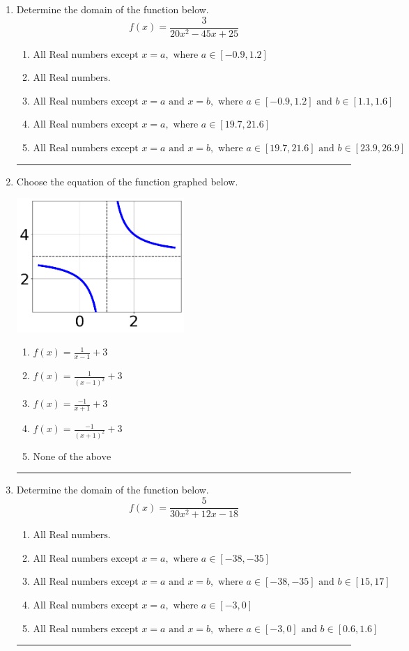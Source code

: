 \documentclass[14pt]{extbook}
\newcommand{\litem}[1]{\item#1\hspace*{-1cm}\rule{\textwidth}{0.4pt}}
\begin{document}
\begin{enumerate}
{\begin{enumerate}[label=\Alph*.]
\end{enumerate} }
\litem{
Determine the domain of the function below.\[ f(x) = \frac{3}{20x^{2} -45 x + 25} \]\begin{enumerate}[label=\Alph*.]
\item \( \text{All Real numbers except } x = a, \text{ where } a \in [-0.9, 1.2] \)
\item \( \text{All Real numbers.} \)
\item \( \text{All Real numbers except } x = a \text{ and } x = b, \text{ where } a \in [-0.9, 1.2] \text{ and } b \in [1.1, 1.6] \)
\item \( \text{All Real numbers except } x = a, \text{ where } a \in [19.7, 21.6] \)
\item \( \text{All Real numbers except } x = a \text{ and } x = b, \text{ where } a \in [19.7, 21.6] \text{ and } b \in [23.9, 26.9] \)

\end{enumerate} }
\litem{
Choose the equation of the function graphed below.
\begin{center}
    \includegraphics[width=0.5\textwidth]{../Figures/rationalGraphToEquationA.png}
\end{center}
\begin{enumerate}[label=\Alph*.]
\item \( f(x) = \frac{1}{x - 1} + 3 \)
\item \( f(x) = \frac{1}{(x - 1)^2} + 3 \)
\item \( f(x) = \frac{-1}{x + 1} + 3 \)
\item \( f(x) = \frac{-1}{(x + 1)^2} + 3 \)
\item \( \text{None of the above} \)

\end{enumerate} }
\litem{
Determine the domain of the function below.\[ f(x) = \frac{5}{30x^{2} +12 x -18} \]\begin{enumerate}[label=\Alph*.]
\item \( \text{All Real numbers.} \)
\item \( \text{All Real numbers except } x = a, \text{ where } a \in [-38, -35] \)
\item \( \text{All Real numbers except } x = a \text{ and } x = b, \text{ where } a \in [-38, -35] \text{ and } b \in [15, 17] \)
\item \( \text{All Real numbers except } x = a, \text{ where } a \in [-3, 0] \)
\item \( \text{All Real numbers except } x = a \text{ and } x = b, \text{ where } a \in [-3, 0] \text{ and } b \in [0.6, 1.6] \)


\end{enumerate}}
\end{enumerate}
\end{document}
